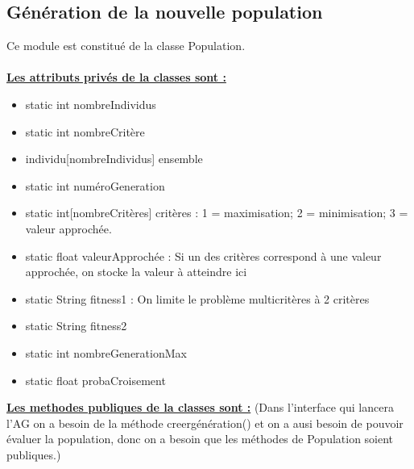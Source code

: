 \documentclass[a4paper,11pt]{article}
\begin{document}
		\subsection{Génération de la nouvelle population}
			Ce module est constitué de la classe Population.\\
			\\
			\underline{\bf Les attributs privés de la classes sont :}\\
				\begin{itemize}
				\item static int nombreIndividus
				\item static int nombreCritère
				\item individu[nombreIndividus] ensemble
				\item static int numéroGeneration
				\item static int[nombreCritères] critères : 1  = maximisation; 2 = minimisation; 3 = valeur approchée.
				\item static float valeurApprochée : Si un des critères correspond à une valeur approchée, on stocke la valeur à atteindre ici
				\item static String fitness1 : On limite le problème multicritères à 2 critères
				\item static String fitness2
				\item static int nombreGenerationMax
				\item static float probaCroisement\\
			\end{itemize}


			\underline{\bf Les methodes publiques de la classes sont :} (Dans l'interface qui lancera l’AG on a besoin de la méthode creergénération() et on a ausi besoin de pouvoir évaluer la population, donc on a besoin que les méthodes de Population soient publiques.)\\\\
\end{document}

